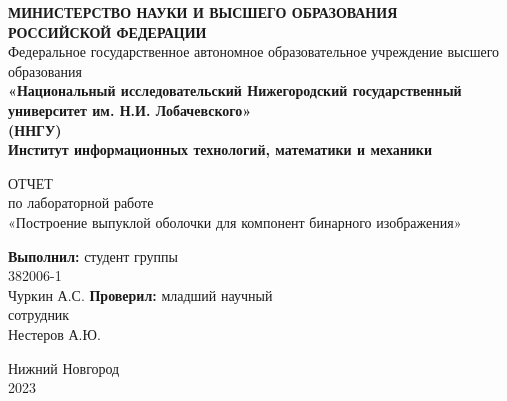 \documentclass[14pt, russian]{extarticle}
\title{}
\author{}
\date{}
\begin{document}
	\begin{titlepage}
		\begin{center}
			{\bfseries МИНИСТЕРСТВО НАУКИ И ВЫСШЕГО ОБРАЗОВАНИЯ \\
				РОССИЙСКОЙ ФЕДЕРАЦИИ}
			\\
			Федеральное государственное автономное образовательное учреждение высшего образования
			\\
			{\bfseries «Национальный исследовательский Нижегородский государственный университет им. Н.И. Лобачевского»\\(ННГУ)
				\\Институт информационных технологий, математики и механики} \\
		\end{center}
		
		\vspace{8em}
		
		\begin{center}
			ОТЧЕТ \\ по лабораторной работе \\
			«Построение выпуклой оболочки для компонент бинарного изображения»
		\end{center}
		
		\vspace{5em}
		
		
		\begin{flushright}
			{\bfseries Выполнил:} студент группы\\382006-1\\Чуркин А.С. \underline{\hspace{3cm}} \linebreak\linebreak\linebreak
			{\bfseries Проверил:} младший научный\\сотрудник\\Нестеров А.Ю. \underline{\hspace{3cm}} 
		\end{flushright}
		
		
		\vspace{\fill}
		
		\begin{center}
			Нижний Новгород\\2023
		\end{center}
		
	\end{titlepage}
	
	\tableofcontents
	\thispagestyle{empty}
	\newpage
	
\end{document}

